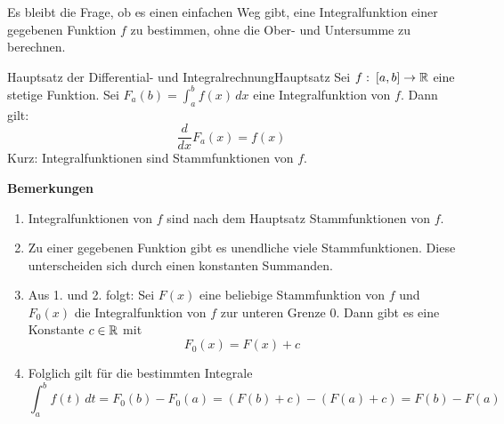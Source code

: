 Es bleibt die Frage, ob es einen einfachen Weg gibt, eine Integralfunktion einer gegebenen Funktion $f$ zu bestimmen, ohne die Ober- und Untersumme zu berechnen.

\begin{satz}
	{Hauptsatz der Differential- und Integralrechnung}{Hauptsatz}
	Sei $f: \: [a,b] \rightarrow \mathbb{R}$ eine stetige Funktion. Sei $F_a(b)=\int_a^b f(x) \,dx$ eine Integralfunktion von $f$. Dann gilt:
	$$ \frac{d}{dx} F_a(x) = f(x) $$
	Kurz: Integralfunktionen sind Stammfunktionen von $f$.
\end{satz}
\textbf{Bemerkungen}
\begin{enumerate}
	\item Integralfunktionen von $f$ sind nach dem Hauptsatz Stammfunktionen von $f$.
	\item Zu einer gegebenen Funktion gibt es unendliche viele Stammfunktionen. Diese unterscheiden sich durch einen konstanten Summanden.
	\item Aus 1. und 2. folgt: Sei $F(x)$ eine beliebige Stammfunktion von $f$ und $F_0(x)$ die Integralfunktion von $f$ zur unteren Grenze $0$. Dann gibt es eine Konstante $c\in \mathbb{R}$ mit
	      $$F_0(x)=F(x)+c$$
	\item Folglich gilt für die bestimmten Integrale
	      $$ \int_{a}^{b} f(t) \, dt = F_0(b) - F_0(a) = \left(F(b)+c\right)-\left(F(a)+c\right) = F(b) -F(a) $$
\end{enumerate}

